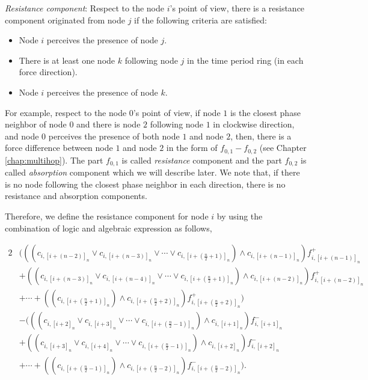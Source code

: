\textit{Resistance component}:
Respect to the node $i$'s point of view, there is a resistance component originated from node $j$ if the following criteria are satisfied:
\begin{itemize}
\item Node $i$ perceives the presence of node $j$.
\item There is at least one node $k$ following node $j$ in the time period ring (in each force direction). 
\item Node $i$ perceives the presence of node $k$.
\end{itemize}
For example, respect to the node $0$'s point of view, if node $1$ is the closest phase neighbor of node $0$ and there is node $2$ following node $1$ in clockwise direction, and node $0$ perceives the presence of both node $1$ and node $2$, then, there is a force difference between node $1$ and node $2$ in the form of $f_{0,1} - f_{0,2}$ (see Chapter \ref{chap:multihop}). The part $f_{0,1}$ is called \textit{resistance} component and the part $f_{0,2}$ is called \textit{absorption} component which we will describe later. We note that, if there is no node following the closest phase neighbor in each direction, there is no resistance and absorption components.

Therefore, we define the resistance component for node $i$ by using the combination of logic and algebraic expression as follows,

\begin{alignat}{2}
&\Bigg(((c_{i,[i+(n-2)]_n} 
    \lor c_{i,[i+(n-3)]_n} 
    \lor \cdots \lor c_{i,[i+(\frac{n}{2} + 1)]_n})
    \land c_{i,[i+(n-1)]_n}) f_{i,[i+(n-1)]_n}^{+} \nonumber \\
  &+ ((c_{i,[i+(n-3)]_n} \lor c_{i,[i+(n-4)]_n} 
    \lor \cdots \lor c_{i,[i+(\frac{n}{2} + 1)]_n})
    \land c_{i,[i+(n-2)]_n}) f_{i,[i+(n-2)]_n}^{+} \nonumber \\
  &+ \cdots + ((c_{i,[i+(\frac{n}{2} + 1)]_n})\land c_{i,[i+(\frac{n}{2}+2)]_n})f_{i,[i+(\frac{n}{2}+2)]_n}^{+}\Bigg) \nonumber \\
&-\Bigg(((c_{i,[i+2]_n} 
    \lor c_{i,[i+3]_n} \lor \cdots \lor c_{i,[i+(\frac{n}{2} - 1)]_n})
    \land c_{i,[i+1]_n})  f_{i,[i+1]_n}^{-} \nonumber \\
  &+ ((c_{i,[i+3]_n} \lor c_{i,[i+4]_n} \lor \cdots \lor c_{i,[i+(\frac{n}{2} - 1)]_n})
    \land c_{i,[i+2]_n})  f_{i,[i+2]_n}^{-} \nonumber \\
  &+ \cdots + ((c_{i,[i+(\frac{n}{2} - 1)]_n}) \land c_{i,[i+(\frac{n}{2}-2)]_n})f_{i,[i+(\frac{n}{2}-2)]_n}^{-}\Bigg).
\label{eq:logicalor}
\end{alignat}


